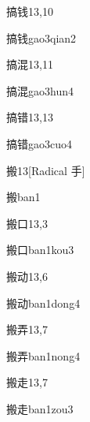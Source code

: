 \begin{entry}{搞钱}{13,10}
  \begin{phonetics}{搞钱}{gao3qian2}
  \end{phonetics}
\end{entry}

\begin{entry}{搞混}{13,11}
  \begin{phonetics}{搞混}{gao3hun4}
  \end{phonetics}
\end{entry}

\begin{entry}{搞错}{13,13}
  \begin{phonetics}{搞错}{gao3cuo4}
  \end{phonetics}
\end{entry}

\begin{entry}{搬}{13}[Radical 手]
  \begin{phonetics}{搬}{ban1}
  \end{phonetics}
\end{entry}

\begin{entry}{搬口}{13,3}
  \begin{phonetics}{搬口}{ban1kou3}
  \end{phonetics}
\end{entry}

\begin{entry}{搬动}{13,6}
  \begin{phonetics}{搬动}{ban1dong4}
  \end{phonetics}
\end{entry}

\begin{entry}{搬弄}{13,7}
  \begin{phonetics}{搬弄}{ban1nong4}
  \end{phonetics}
\end{entry}

\begin{entry}{搬走}{13,7}
  \begin{phonetics}{搬走}{ban1zou3}
  \end{phonetics}
\end{entry}

